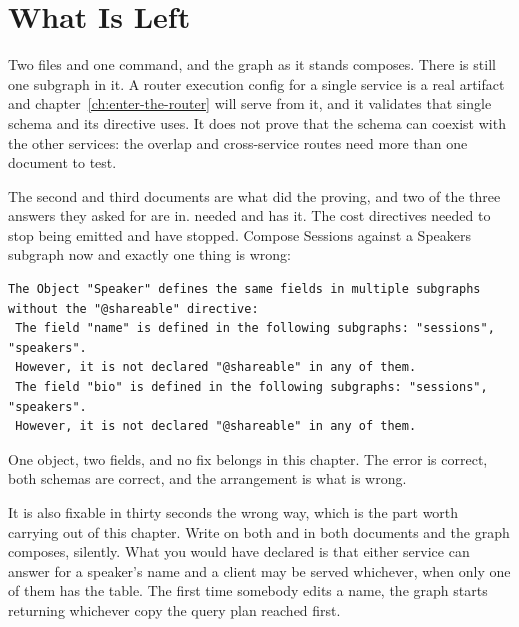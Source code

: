 \section{What Is Left}
\label{sec:ch07-what-is-left}

%
Two files and one command, and the graph as it stands composes. There is still
one subgraph in it. A router execution config for a single service is a real
artifact and chapter~\ref{ch:enter-the-router} will serve from it, and it
validates that single schema and its directive uses. It does not prove that
the schema can coexist with the other services: the overlap and cross-service
routes need more than one document to test.

%
The second and third documents are what did the proving, and two of the three
answers they asked for are in.  needed  and
has it. The cost directives needed to stop being emitted and have stopped.
Compose Sessions against a Speakers subgraph now and exactly one thing is
wrong:

\begin{verbatim}
The Object "Speaker" defines the same fields in multiple subgraphs without the "@shareable" directive:
 The field "name" is defined in the following subgraphs: "sessions", "speakers".
 However, it is not declared "@shareable" in any of them.
 The field "bio" is defined in the following subgraphs: "sessions", "speakers".
 However, it is not declared "@shareable" in any of them.
\end{verbatim}

%
One object, two fields, and no fix belongs in this chapter. The error is
correct, both schemas are correct, and the arrangement is what is wrong.

%
It is also fixable in thirty seconds the wrong way, which is the part worth
carrying out of this chapter. Write  on both  and  in
both documents and the graph composes, silently. What you would have declared
is that either service can answer for a speaker's name and a client may be
served whichever, when only one of them has the table. The first time somebody
edits a name, the graph starts returning whichever copy the query plan reached
first.

